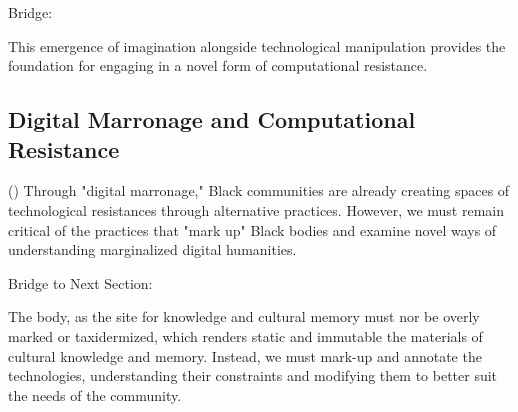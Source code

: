 Bridge:

 This emergence of imagination alongside technological manipulation provides the foundation for engaging in a novel form of computational resistance.
 
\subsection{Digital Marronage and Computational Resistance}(\parencite{Johnson_2018})
Through "digital marronage," Black communities are already creating spaces of technological resistances through alternative practices. However, we must remain critical of the practices that "mark up" Black bodies and examine novel ways of understanding marginalized digital humanities.

Bridge to Next Section:

The body, as the site for knowledge and cultural memory must nor be overly marked or taxidermized, which renders static and immutable the materials of cultural knowledge and memory. Instead, we must mark-up and annotate the technologies, understanding their constraints and modifying them to better suit the needs of  the community.